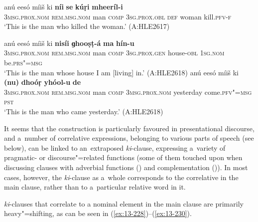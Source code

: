 \ea
\label{ex:13-225}
\gll anú eesó míiš ki \textbf{níi} \textbf{se} \textbf{kúṛi} \textbf{mheeríl-i}\\
\textsc{3msg.prox.nom} \textsc{rem.msg.nom} man \textsc{comp} \textsc{3sg.prox.obl} \textsc{def} woman kill.\textsc{pfv-f}\\
\glt `This is the man who killed the woman.' (A:HLE2617)

\ex
\label{ex:13-226}
\gll anú eesó míiš ki \textbf{nisíi} \textbf{ɡhooṣṭ-á} \textbf{ma} \textbf{hín-u}\\
\textsc{3msg.prox.nom} \textsc{rem.msg.nom} man \textsc{comp} \textsc{3sg.prox.gen} house-\textsc{obl} \textsc{1sg.nom} be.\textsc{prs"=msg}\\
\glt `This is the man whose house I am [living] in.' (A:HLE2618) 
\ex
\label{ex:13-227}
\gll anú eesó míiš ki \textbf{(nu)} \textbf{dhoóṛ} \textbf{yhóol-u} \textbf{de}\\
\textsc{3msg.prox.nom} \textsc{rem.msg.nom} man \textsc{comp} \textsc{3msg.prox.nom} yesterday come.\textsc{pfv"=msg} \textsc{pst}\\
\glt `This is the man who came yesterday.' (A:HLE2618) 
\z

It seems that the construction is particularly favoured in presentational discourse, and a~number of correlative expressions, belonging to various parts of speech (see below), can be linked to an~extraposed \textit{ki}-clause, expressing a~variety of pragmatic- or discourse"=related functions (some of them touched upon when discussing clauses with adverbial functions () and complementation ()). In most cases, however, the \textit{ki}-clause as a~whole corresponds to the correlative in the main clause, rather than to a~particular relative word in it.

 \textit{ki}-clauses that correlate to a nominal element in the main clause are primarily heavy"=shifting, as can be seen in (\ref{ex:13-228})--(\ref{ex:13-230}).

